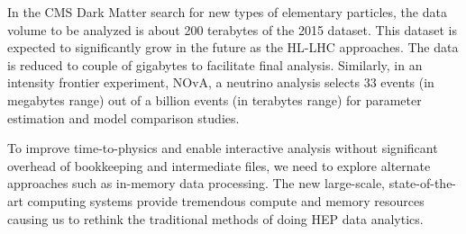 In the CMS Dark Matter search for new types of elementary particles,
the data volume to be analyzed is about 200 terabytes of the 2015 dataset. 
 This dataset is expected to significantly grow in the future as the HL-LHC approaches. 
 The data is reduced to couple of gigabytes to facilitate final analysis.  
Similarly, in an intensity frontier experiment, NOvA, a neutrino analysis selects 33 events (in megabytes range) out of a billion events (in terabytes range) for 
parameter estimation and model comparison studies. 

To 
improve time-to-physics and enable interactive analysis without significant overhead of bookkeeping and intermediate 
files, 
we need to explore alternate approaches such as in-memory data processing. The new large-scale, state-of-the-art computing systems provide tremendous compute and memory resources causing us to rethink the traditional methods of doing HEP data analytics.  
